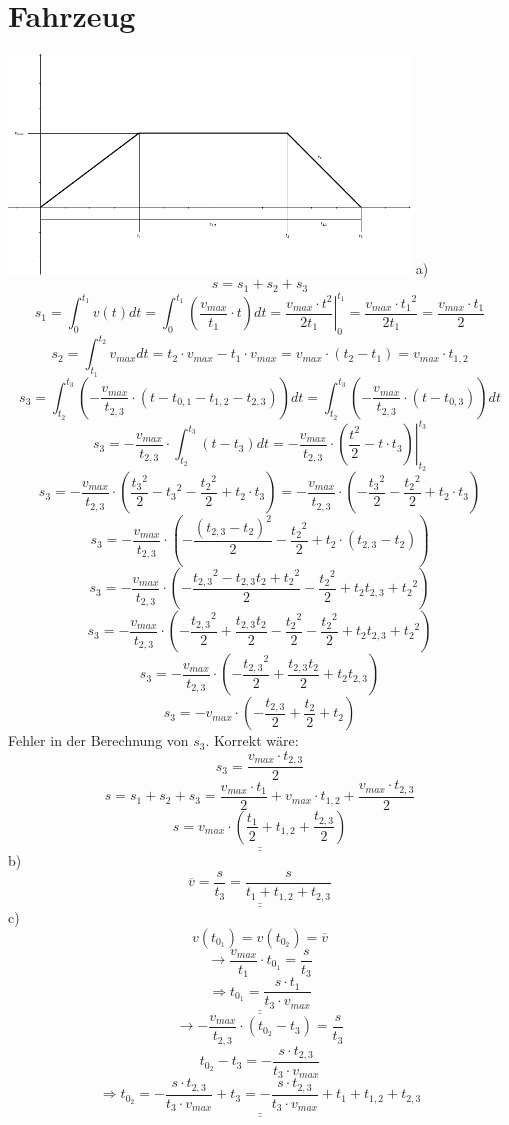 \section{Fahrzeug}
\includegraphics[width=0.8\textwidth]{bilder/fahrzeug_svg.pdf}
a)
\[ s = s_1 + s_2 + s_3 \]
\[ s_1 = \int_0^{t_1} v(t) dt = \int_0^{t_1} \left( \frac{v_{max}}{t_1} \cdot t \right) dt = \left. \frac{v_{max} \cdot t^2}{2 t_1} \right|_0^{t_1} = \frac{v_{max} \cdot {t_1}^2}{2 t_1} = \frac{v_{max} \cdot {t_1}}{2} \]
\[ s_2 = \int_{t_1}^{t_2} v_{max} dt = t_2 \cdot v_{max} - t_1 \cdot v_{max} = v_{max} \cdot (t_2 - t_1) = v_{max} \cdot t_{1,2} \]
\[ s_3 = \int_{t_2}^{t_3} \left(-\frac{v_{max}}{t_{2,3}} \cdot (t - t_{0,1} - t_{1,2} - t_{2,3})\right) dt = \int_{t_2}^{t_3} \left(-\frac{v_{max}}{t_{2,3}} \cdot (t - t_{0,3})\right) dt \]
\[ s_3 = -\frac{v_{max}}{t_{2,3}} \cdot \int_{t_2}^{t_3} \left(t - t_3\right) dt = -\frac{v_{max}}{t_{2,3}} \cdot \left.\left(\frac{t^2}{2} - t \cdot t_3\right)\right|_{t_2}^{t_3} \]
\[ s_3 = -\frac{v_{max}}{t_{2,3}} \cdot \left(\frac{{t_3}^2}{2} - {t_3}^2 - \frac{{t_2}^2}{2} + t_2 \cdot t_3\right) = -\frac{v_{max}}{t_{2,3}} \cdot \left(-\frac{{t_3}^2}{2} - \frac{{t_2}^2}{2} + t_2 \cdot t_3\right) \]
\[ s_3 = -\frac{v_{max}}{t_{2,3}} \cdot \left(-\frac{(t_{2,3} - t_2)^2}{2} - \frac{{t_2}^2}{2} + t_2 \cdot (t_{2,3} - t_2)\right) \]
\[ s_3 = -\frac{v_{max}}{t_{2,3}} \cdot \left(-\frac{{t_{2,3}}^2 - t_{2,3} t_2 + {t_2}^2}{2} - \frac{{t_2}^2}{2} + t_2 t_{2,3} + {t_2}^2\right) \]
\[ s_3 = -\frac{v_{max}}{t_{2,3}} \cdot \left(-\frac{{t_{2,3}}^2}{2} + \frac{t_{2,3} t_2}{2} - \frac{{t_2}^2}{2} - \frac{{t_2}^2}{2} + t_2 t_{2,3} + {t_2}^2\right) \]
\[ s_3 = -\frac{v_{max}}{t_{2,3}} \cdot \left(-\frac{{t_{2,3}}^2}{2} + \frac{t_{2,3} t_2}{2} + t_2 t_{2,3}\right) \]
\[ s_3 = -v_{max} \cdot \left(-\frac{{t_{2,3}}}{2} + \frac{t_2}{2} + t_2\right) \]
Fehler in der Berechnung von $s_3$. Korrekt wäre: 
\[ s_3 = \frac{v_{max} \cdot t_{2,3}}{2} \]
\[ s = s_1 + s_2 + s_3 = \frac{v_{max} \cdot {t_1}}{2} + v_{max} \cdot t_{1,2} + \frac{v_{max} \cdot t_{2,3}}{2} \]
\[ \underline{\underline{s = v_{max} \cdot \left(\frac{{t_1}}{2} + t_{1,2} + \frac{t_{2,3}}{2}\right)}} \]
b)
\[ \underline{\underline{\overline{v} = \frac{s}{t_3} = \frac{s}{t_{1} + t_{1,2} + t_{2,3}}}} \]
c)
\[ v(t_{0_1}) = v(t_{0_2}) = \overline{v} \]
\[ \rightarrow \frac{v_{max}}{t_1} \cdot t_{0_1} = \frac{s}{t_3} \]
\[ \underline{\underline{\Rightarrow t_{0_1} = \frac{s \cdot t_1}{t_3 \cdot v_{max}}}} \]
\[ \rightarrow -\frac{v_{max}}{t_{2,3}} \cdot (t_{0_2} - t_3) = \frac{s}{t_3} \]
\[ t_{0_2} - t_3 = -\frac{s \cdot t_{2,3}}{t_3 \cdot v_{max}} \]
\[ \underline{\underline{\Rightarrow t_{0_2} = -\frac{s \cdot t_{2,3}}{t_3 \cdot v_{max}} + t_3 = -\frac{s \cdot t_{2,3}}{t_3 \cdot v_{max}} + t_1 + t_{1,2} + t_{2,3}}} \]